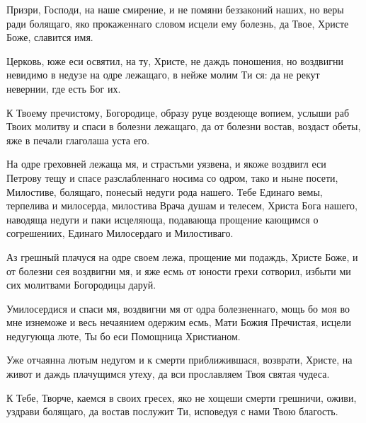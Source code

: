 \begin{mymulticols}
Призри, Господи, на наше смирение, и не помяни беззаконий наших, но веры ради болящаго, яко прокаженнаго словом исцели ему болезнь, да Твое, Христе Боже, славится имя.

\slava

Церковь, юже еси освятил, на ту, Христе, не даждь поношения, но воздвигни невидимо в недузе на одре лежащаго, в нейже молим Ти ся: да не рекут невернии, где есть Бог их.

\inyne

К Твоему пречистому, Богородице, образу руце воздеюще вопием, услыши раб Твоих молитву и спаси в болезни лежащаго, да от болезни востав, воздаст обеты, яже в печали глаголаша уста его.




На одре греховней лежаща мя, и страстьми уязвена, и якоже воздвигл еси Петрову тещу и спасе разслабленнаго носима со одром, тако и ныне посети, Милостиве, болящаго, понесый недуги рода нашего. Тебе Единаго вемы, терпелива и милосерда, милостива Врача душам и телесем, Христа Бога нашего, наводяща недуги и паки исцеляюща, подавающа прощение кающимся о согрешениих, Единаго Милосердаго и Милостиваго.

\slava

Аз грешный плачуся на одре своем лежа, прощение ми подаждь, Христе Боже, и от болезни сея воздвигни мя, и яже есмь от юности грехи сотворил, избыти ми сих молитвами Богородицы даруй.

\inyne

Умилосердися и спаси мя, воздвигни мя от одра болезненнаго, мощь бо моя во мне изнеможе и весь нечаянием одержим есмь, Мати Божия Пречистая, исцели недугующа люте, Ты бо еси Помощница Христианом.






\normalfont{}Уже отчаянна лютым недугом и к смерти приближившася, возврати, Христе, на живот и даждь плачущимся утеху, да вси прославляем Твоя святая чудеса.


\normalfont{}К Тебе, Творче, каемся в своих гресех, яко не хощеши смерти грешничи, оживи, уздрави болящаго, да востав послужит Ти, исповедуя с нами Твою благость.


\end{mymulticols}
